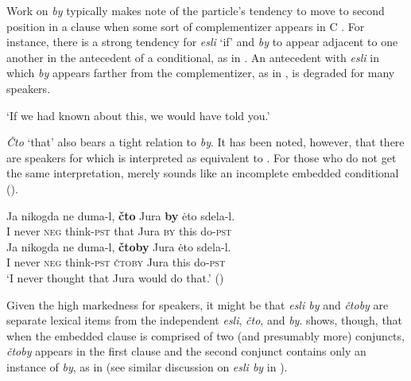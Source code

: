 \documentclass[output=paper,
modfonts,
newtxmath,
hidelinks,
]{langscibook}
\begin{document}
Work on \textit{by} typically makes note of the particle’s tendency to move to second position in a clause when some sort of complementizer appears in C \citep[29]{Hacking1998}. For instance, there is a strong tendency for \textit{esli} ‘if’ and \textit{by} to appear adjacent to one another in the antecedent of a conditional, as in . An antecedent with \textit{esli} in which \textit{by} appears farther from the complementizer, as in , is degraded for many speakers. 

\ea 
{}
\z 
\glt `If we had known about this, we would have told you.'\hfill \citep[29]{Hacking1998}
\z

\noindent \textit{Čto} ‘that’ also bears a tight relation to \textit{by}. It has been noted, however, that there are speakers for which  is interpreted as equivalent to . For those who do not get the same interpretation,  merely sounds like an incomplete embedded conditional (\citealt[40]{Brecht1977}).

\ea \ea\label{ex26}
\gll Ja nikogda ne duma-l, \textbf{čto} Jura \textbf{by} \.eto sdela-l.\\
     I never \textsc{neg} think\textsc{-pst} that Jura \textsc{by} this do\textsc{-pst}\\
     \ex \label{ex27}
\gll Ja nikogda ne duma-l, \textbf{čtoby} Jura \.eto sdela-l.\\
     I never \textsc{neg} think\textsc{-pst} \textsc{čtoby} Jura this do\textsc{-pst}\\
\z
\glt `I never thought that Jura would do that.' \hfill (\citealt[40, fn. 10]{Brecht1977})
\z


\noindent Given the high markedness for speakers, it might be that \textit{esli by} and \textit{čtoby} are separate lexical items from the independent \textit{esli}, \textit{čto}, and \textit{by}. \citet{Brecht1977} shows, though, that when the embedded clause is comprised of two (and presumably more) conjuncts, \textit{čtoby} appears in the first clause and the second conjunct contains only an instance of \textit{by}, as in  (see similar discussion on \textit{esli by} in \citealt[29-32]{Hacking1998}).
\end{document}

